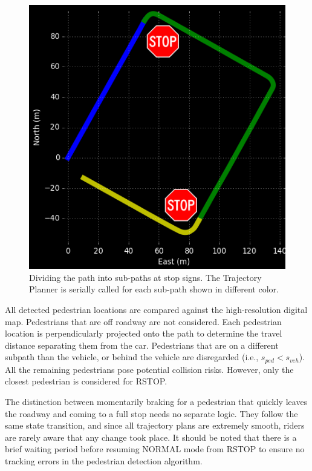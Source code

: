 \documentclass[letterpaper, 10 pt, conference]{ieeeconf}  %
\begin{document}
\begin{figure}[tb]
  \centering
  \includegraphics[width=0.5\columnwidth]{graphics/Subpaths.png}
  \caption{
    Dividing the path into sub-paths at stop signs.
    The Trajectory Planner is serially called for each sub-path shown in different color.
  }
  \label{fig:subpathdivision}
\end{figure}

All detected pedestrian locations are compared against the high-resolution digital map. Pedestrians that are off roadway are not considered.
Each pedestrian location is perpendicularly projected onto the path to determine the travel distance separating them from the car.
Pedestrians that are on a different subpath than the vehicle, or behind the vehicle are disregarded (i.e., $s_{ped} < s_{veh}$).
All the remaining pedestrians pose potential collision risks. However, only the closest pedestrian is considered for RSTOP.

The distinction between momentarily braking for a pedestrian that quickly leaves the roadway and coming to a full stop needs no separate logic.
They follow the same state transition, and since all trajectory plans are extremely smooth, riders are rarely aware that any change took place.
It should be noted that there is a brief waiting period before resuming NORMAL mode from RSTOP to ensure no tracking errors in the pedestrian detection algorithm.
\end{document}
